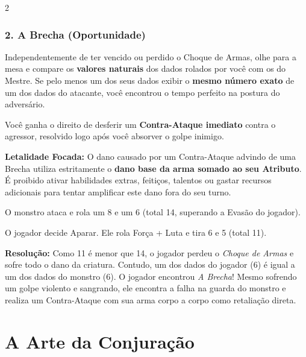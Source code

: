 \documentclass[a4paper,11pt,openany]{book}
\begin{document}
\begin{multicols}{2}
\subsection*{2. A Brecha (Oportunidade)}
Independentemente de ter vencido ou perdido o Choque de Armas, olhe para a mesa e compare os \textbf{valores naturais} dos dados rolados por você com os do Mestre.
Se pelo menos um dos seus dados exibir o \textbf{mesmo número exato} de um dos dados do atacante, você encontrou o tempo perfeito na postura do adversário.

Você ganha o direito de desferir um \textbf{Contra-Ataque imediato} contra o agressor, resolvido logo após você absorver o golpe inimigo. 

\begin{regra}
\textbf{Letalidade Focada:} O dano causado por um Contra-Ataque advindo de uma Brecha utiliza estritamente o \textbf{dano base da arma somado ao seu Atributo}. É proibido ativar habilidades extras, feitiços, talentos ou gastar recursos adicionais para tentar amplificar este dano fora do seu turno.
\end{regra}

\begin{exemplo}
O monstro ataca e rola um 8 e um 6 (total 14, superando a Evasão do jogador). 

O jogador decide Aparar. Ele rola Força + Luta e tira 6 e 5 (total 11).

\textbf{Resolução:} Como 11 é menor que 14, o jogador perdeu o \textit{Choque de Armas} e sofre todo o dano da criatura. Contudo, um dos dados do jogador (6) é igual a um dos dados do monstro (6). O jogador encontrou \textit{A Brecha}! Mesmo sofrendo um golpe violento e sangrando, ele encontra a falha na guarda do monstro e realiza um Contra-Ataque com sua arma corpo a corpo como retaliação direta.
\end{exemplo}

\end{multicols}


\chapter{A Arte da Conjuração}
\end{document}
